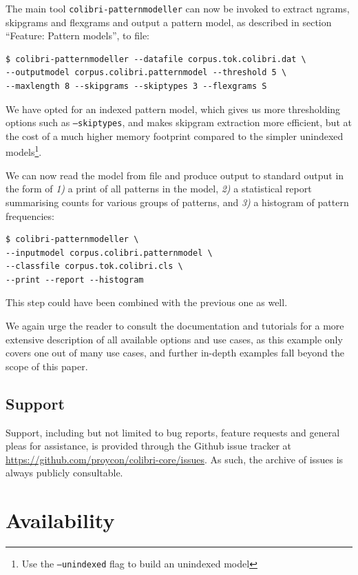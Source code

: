 The main tool \texttt{colibri-patternmodeller} can now be invoked to extract
ngrams, skipgrams and flexgrams and output a pattern model, as described in
section ``Feature: Pattern models'', to file:

\begin{verbatim}
$ colibri-patternmodeller --datafile corpus.tok.colibri.dat \
--outputmodel corpus.colibri.patternmodel --threshold 5 \
--maxlength 8 --skipgrams --skiptypes 3 --flexgrams S
\end{verbatim}

We have opted for an indexed pattern model, which gives us more thresholding
options such as \texttt{--skiptypes}, and makes skipgram extraction more
efficient, but at the cost of a much higher memory footprint compared to
the simpler unindexed models\footnote{Use the \texttt{--unindexed} flag to
build an unindexed model}.

We can now read the model from file and produce output to standard output in
the form of \emph{1)} a print of all patterns in the model, \emph{2)} a
statistical report summarising counts for various groups of patterns, and
\emph{3)} a histogram of pattern frequencies:

\begin{verbatim}
$ colibri-patternmodeller \
--inputmodel corpus.colibri.patternmodel \
--classfile corpus.tok.colibri.cls \
--print --report --histogram
\end{verbatim}

This step could have been combined with the previous one as well.

We again urge the reader to consult the documentation and tutorials for a more
extensive description of all available options and use cases, as this example
only covers one out of many use cases, and further in-depth examples fall beyond
the scope of this paper.

\subsection*{Support}

Support, including but not limited to bug reports, feature requests and general
pleas for assistance, is provided through the Github issue tracker at
\url{https://github.com/proycon/colibri-core/issues}. As such, the archive of
issues is always publicly consultable.

\section{Availability}

